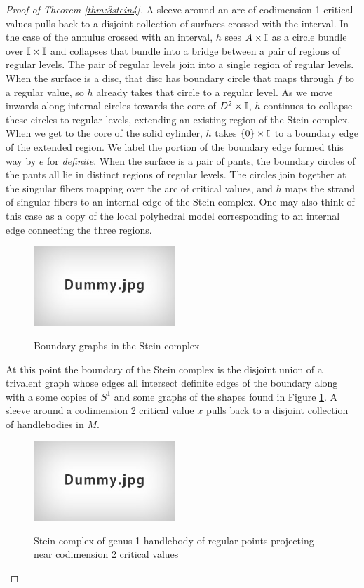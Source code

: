 \begin{proof}[Proof of Theorem \ref{thm:3stein4}]
	A sleeve around an arc of codimension 1 critical values pulls back to a disjoint collection of surfaces crossed with the interval.
	In the case of the annulus crossed with an interval, $h$ sees $A\times\mathbb{I}$ as a circle bundle over $\mathbb{I}\times\mathbb{I}$ and collapses that bundle into a bridge between a pair of regions of regular levels.
	The pair of regular levels join into a single region of regular levels.
	When the surface is a disc, that disc has boundary circle that maps through $f$ to a regular value, so $h$ already takes that circle to a regular level.
	As we move inwards along internal circles towards the core of $D^2\times\mathbb{I}$, $h$ continues to collapse these circles to regular levels, extending an existing region of the Stein complex.
	When we get to the core of the solid cylinder, $h$ takes $\{0\}\times\mathbb{I}$ to a boundary edge of the extended region.
	We label the portion of the boundary edge formed this way by $e$ for \emph{definite}.
	When the surface is a pair of pants, the boundary circles of the pants all lie in distinct regions of regular levels.
	The circles join together at the singular fibers mapping over the arc of critical values, and $h$ maps the strand of singular fibers to an internal edge of the Stein complex.
	One may also think of this case as a copy of the local polyhedral model corresponding to an internal edge connecting the three regions.

	\begin{figure}
		\centering
		\captionsetup{justification=centering}
		\caption{Boundary graphs in the Stein complex}
		\includegraphics[height=3cm]{figures/dummy.jpg}
		\label{fig:holegraphs}
	\end{figure}
	
	At this point the boundary of the Stein complex is the disjoint union of a trivalent graph whose edges all intersect definite edges of the boundary along with a some copies of $S^1$ and some graphs of the shapes found in Figure \ref{fig:holegraphs}.
	A sleeve around a codimension 2 critical value $x$ pulls back to a disjoint collection of handlebodies in $M$.
	
	\begin{figure}
		\centering
		\captionsetup{justification=centering}
		\caption{Stein complex of genus 1 handlebody of regular points projecting near codimension 2 critical values}
		\includegraphics[height=3cm]{figures/dummy.jpg}
		\label{fig:codim2steinregular}
	\end{figure}
	

\end{proof}
